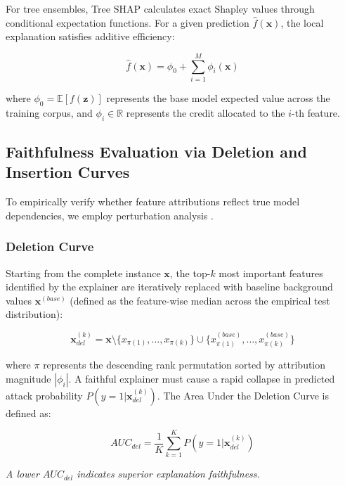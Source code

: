 \documentclass[conference]{IEEEtran}
\begin{document}
For tree ensembles, Tree SHAP calculates exact Shapley values through conditional expectation functions. For a given prediction $\hat{f}(\mathbf{x})$, the local explanation satisfies additive efficiency:

\begin{equation}
\hat{f}(\mathbf{x}) = \phi_0 + \sum_{i=1}^M \phi_i(\mathbf{x})
\end{equation}

where $\phi_0 = \mathbb{E}[f(\mathbf{z})]$ represents the base model expected value across the training corpus, and $\phi_i \in \mathbb{R}$ represents the credit allocated to the $i$-th feature.

\subsection{Faithfulness Evaluation via Deletion and Insertion Curves}

To empirically verify whether feature attributions reflect true model dependencies, we employ perturbation analysis \cite{petsiuk2018rise}.

\subsubsection{Deletion Curve}

Starting from the complete instance $\mathbf{x}$, the top-$k$ most important features identified by the explainer are iteratively replaced with baseline background values $\mathbf{x}^{(base)}$ (defined as the feature-wise median across the empirical test distribution):

\begin{equation}
\mathbf{x}^{(k)}_{del} = \mathbf{x} \setminus \{x_{\pi(1)}, \dots, x_{\pi(k)}\} \cup \{x^{(base)}_{\pi(1)}, \dots, x^{(base)}_{\pi(k)}\}
\end{equation}

where $\pi$ represents the descending rank permutation sorted by attribution magnitude $|\phi_i|$. A faithful explainer must cause a rapid collapse in predicted attack probability $P(y=1|\mathbf{x}^{(k)}_{del})$. The Area Under the Deletion Curve is defined as:

\begin{equation}
AUC_{del} = \frac{1}{K} \sum_{k=1}^K P(y=1|\mathbf{x}^{(k)}_{del})
\end{equation}

\textit{A lower $AUC_{del}$ indicates superior explanation faithfulness.}
\end{document}
